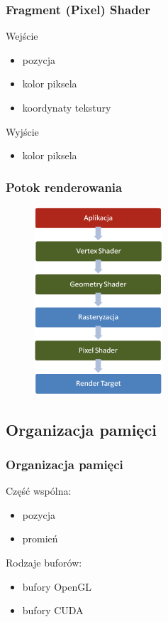 \documentclass{beamer}
\begin{document}
\frame
{
	\frametitle{Fragment (Pixel) Shader}

	\begin{block}{Wejście}
	\begin{itemize}
	\item pozycja
		\item kolor piksela
		\item koordynaty tekstury
		\end{itemize}
	\end{block}
	\begin{block}{Wyjście}
	\begin{itemize}
	\item kolor piksela
		\end{itemize}
	\end{block}
}

\frame
{
	\frametitle{Potok renderowania}
	\begin{figure}
	\centering
		\includegraphics[height=7cm]{img/potok.png}
	\label{fig:potok}
	\end{figure}

}

\subsection{Organizacja pamięci}\label{sub:organizacja pamięci}

\frame
{
	\frametitle{Organizacja pamięci}

	Część wspólna:
		\begin{itemize}
	\item pozycja
		\item promień
		\end{itemize}

	\pause
		Rodzaje buforów:

		\begin{itemize}
	\item bufory OpenGL
		\item bufory CUDA
		\end{itemize}

}
\end{document}
